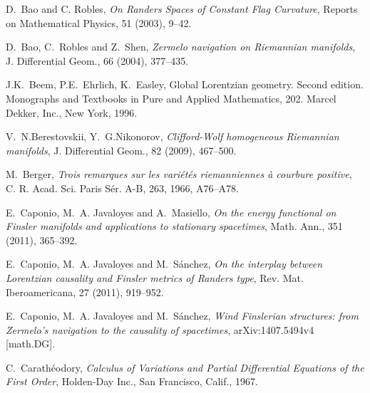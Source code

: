 \documentclass[reqno,10pt]{amsart}
\begin{document}
\begin{thebibliography}{10}


 {\sc D.~Bao and C. Robles}, {\em  On Randers Spaces of Constant Flag Curvature}, Reports on Mathematical Physics, 51 (2003), 9--42.


  
{\sc D.~Bao, C.~Robles and Z.~Shen}, {\em {Zermelo navigation on {R}iemannian
  manifolds}}, J. Differential Geom., 66 (2004),  377--435.



 {\sc J.K.~Beem, P.E.~Ehrlich, K.~Easley}, Global Lorentzian geometry. 
Second edition. Monographs and Textbooks in Pure and Applied Mathematics, 202. Marcel Dekker, Inc., New York, 1996.


 
    {\sc V.~N.Berestovskii, Y.~G.Nikonorov},
      {\em Clifford-{W}olf homogeneous {R}iemannian manifolds}, J. Differential Geom., 82 (2009), 467--500.
     
      {\sc M.~Berger}, {\em Trois remarques sur les vari\'et\'es riemanniennes \`a
              courbure positive}, {C. R. Acad. Sci. Paris S\'er. A-B}, 263, 1966, A76--A78.
      
     
{\sc E.~Caponio, M.~A. Javaloyes and A.~Masiello}, {\em {On the energy
  functional on {F}insler manifolds and applications to stationary
  spacetimes}}, Math. Ann., 351 (2011),  365--392.
      
{\sc E.~Caponio, M.~A. Javaloyes and M.~S{\'a}nchez}, {\em {On the interplay
  between {L}orentzian causality and {F}insler metrics of {R}anders type}},
  Rev. Mat. Iberoamericana, 27 (2011),  919--952.
  
   {\sc E.~Caponio, M.~A. Javaloyes and M.~S{\'a}nchez},  {\em Wind Finslerian structures: from Zermelo's navigation to the causality of spacetimes},  arXiv:1407.5494v4 [math.DG].
  
  
{\sc C.~Carath{\'e}odory}, {\em {Calculus of Variations and Partial
  Differential Equations of the First Order}}, Holden-Day Inc., San Francisco,
  Calif., 1967.


%
%
%
%
  

\end{thebibliography}
\end{document}
